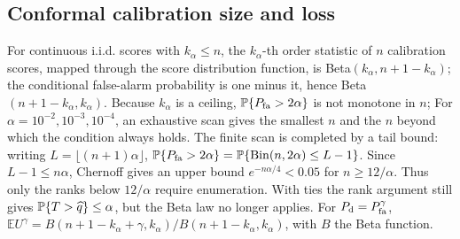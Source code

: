 \subsection{Conformal calibration size and loss}
For continuous i.i.d. scores with $k_\alpha\le n$, the $k_\alpha$-th order statistic of $n$ calibration scores, mapped through the score distribution function, is Beta$(k_\alpha,n+1-k_\alpha)$; the conditional false-alarm probability is one minus it, hence Beta$(n+1-k_\alpha,k_\alpha)$. Because $k_\alpha$ is a ceiling, $\mathbb{P}\{P_{\rm fa}>2\alpha\}$ is not monotone in $n$; For $\alpha=10^{-2},10^{-3},10^{-4}$, an exhaustive scan gives the smallest $n$ and the $n$ beyond which the condition always holds. The finite scan is completed by a tail bound: writing $L=\lfloor(n+1)\alpha\rfloor$, $\mathbb{P}\{P_{\rm fa}>2\alpha\}=\mathbb{P}\{\operatorname{Bin}(n,2\alpha)\le L-1\}$. Since $L-1\le n\alpha$, Chernoff gives an upper bound $e^{-n\alpha/4}<0.05$ for $n\ge12/\alpha$. Thus only the ranks below $12/\alpha$ require enumeration. With ties the rank argument still gives $\mathbb{P}\{T>\widehat q\}\le\alpha$, but the Beta law no longer applies. For $P_{\rm d}=P_{\rm fa}^{\gamma}$, $\mathbb EU^\gamma=B(n+1-k_\alpha+\gamma,k_\alpha)/B(n+1-k_\alpha,k_\alpha)$, with $B$ the Beta function.
